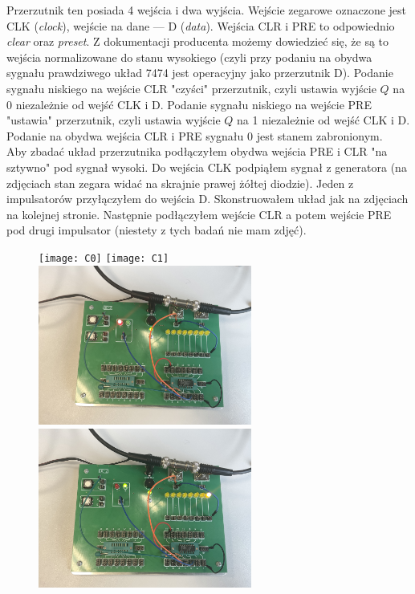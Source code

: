 \documentclass[14pt, table]{extarticle}
\begin{document}
Przerzutnik ten posiada 4 wejścia i dwa wyjścia. Wejście zegarowe oznaczone jest CLK (\textit{clock}), wejście na dane — D (\textit{data}). Wejścia CLR i PRE to odpowiednio \textit{clear} oraz \textit{preset}. Z dokumentacji producenta możemy dowiedzieć się, że są to wejścia normalizowane do stanu wysokiego (czyli przy podaniu na obydwa sygnału prawdziwego układ 7474 jest operacyjny jako przerzutnik D). Podanie sygnału niskiego na wejście CLR "czyści" przerzutnik, czyli ustawia wyjście $Q$ na 0 niezależnie od wejść CLK i D. Podanie sygnału niskiego na wejście PRE "ustawia" przerzutnik, czyli ustawia wyjście $Q$ na 1 niezależnie od wejść CLK i D. Podanie na obydwa wejścia CLR i PRE sygnału 0 jest stanem zabronionym. \\

Aby zbadać układ przerzutnika podłączyłem obydwa wejścia PRE i CLR "na sztywno" pod sygnał wysoki. Do wejścia CLK podpiąłem sygnał z generatora (na zdjęciach stan zegara widać na skrajnie prawej żółtej diodzie). Jeden z impulsatorów przyłączyłem do wejścia D. Skonstruowałem układ jak na zdjęciach na kolejnej stronie. Następnie podłączyłem wejście CLR a potem wejście PRE pod drugi impulsator (niestety z tych badań nie mam zdjęć).

\newpage
\begin{figure}[H]
\texttt{[image: C0]}
\texttt{[image: C1]}
\includegraphics[width=7cm]{C2}
\includegraphics[width=7cm]{C3}
\centering
\captionsetup{labelformat=empty}
\caption{}
\end{figure}
\end{document}
